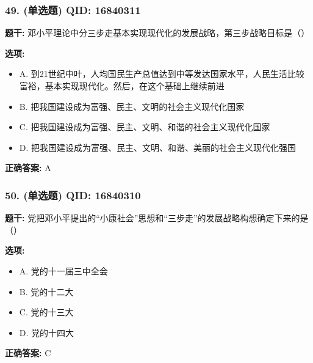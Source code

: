 \documentclass[12pt,UTF8]{ctexart}
\begin{document}
\subsubsection*{49. (单选题) \small QID: 16840311}

\textbf{题干:}
邓小平理论中分三步走基本实现现代化的发展战略，第三步战略目标是（）

\textbf{选项:}
\begin{itemize}[leftmargin=*]

  \item A. 到21世纪中叶，人均国民生产总值达到中等发达国家水平，人民生活比较富裕，基本实现现代化。然后，在这个基础上继续前进

  \item B. 把我国建设成为富强、民主、文明的社会主义现代化国家

  \item C. 把我国建设成为富强、民主、文明、和谐的社会主义现代化国家

  \item D. 把我国建设成为富强、民主、文明、和谐、美丽的社会主义现代化强国

\end{itemize}

\textbf{正确答案:}
A

\vspace{0.3em}\hrulefill\vspace{0.7em}

\subsubsection*{50. (单选题) \small QID: 16840310}

\textbf{题干:}
党把邓小平提出的“小康社会”思想和“三步走”的发展战略构想确定下来的是（）

\textbf{选项:}
\begin{itemize}[leftmargin=*]

  \item A. 党的十一届三中全会

  \item B. 党的十二大

  \item C. 党的十三大

  \item D. 党的十四大

\end{itemize}

\textbf{正确答案:}
C

\vspace{0.3em}\hrulefill\vspace{0.7em}
\end{document}
